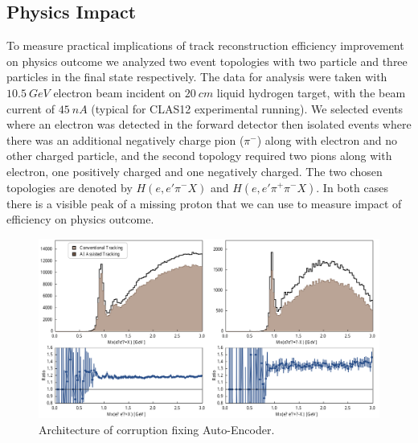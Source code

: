\subsection{Physics Impact}

To measure practical implications of track reconstruction efficiency improvement on physics outcome we analyzed 
two event topologies with two particle and three particles in the final state respectively. The data for analysis were 
taken with $10.5~GeV$ electron beam incident on $20~cm$ liquid hydrogen target, with the beam current of $45~nA$
(typical for CLAS12 experimental running). We selected events where an electron was detected in the forward detector 
then isolated events where there was an additional negatively charge pion ($\pi^-$) along with electron and no other 
charged particle, and the second topology required two pions along with electron, one positively charged and one 
negatively charged. The two chosen topologies are denoted by $H(e,e'\pi^-X)$ and $H(e,e'\pi^+\pi^-X)$. In both cases 
there is a visible peak of a missing proton that we can use to measure impact of efficiency on physics outcome. 

 \begin{figure}[!ht]
\begin{center}
 \includegraphics[width=6.0in]{images/physics_results.pdf}
\caption {Architecture of corruption fixing Auto-Encoder.}
 \label{physics:outcome}
 \end{center}
\end{figure}

